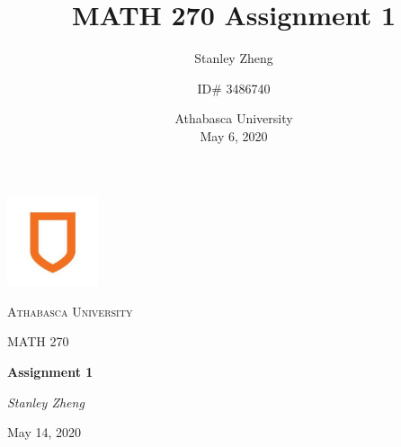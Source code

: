 \documentclass[11pt, letterpaper, twoside]{article}
\title{MATH 270 Assignment 1}
\date{Athabasca University\\May 6, 2020}
\author{Stanley Zheng\and ID\# 3486740}
\begin{document}
\begin{titlepage}
	\centering
	\vspace*{60px}
	\hspace{0pt}
	\includegraphics[width=0.2\textwidth]{logo}\par\vspace{1cm}
	{\scshape\LARGE Athabasca University \par}
	\vspace{1cm}
	{\scshape\Large MATH 270\par}
	\vspace{1.5cm}
	{\huge\bfseries Assignment 1\par}
	\vspace{2cm}
	{\Large\itshape Stanley Zheng\par}
	\vfill
	{\large May 14, 2020\par}
	\vspace*{50px}
	\hspace{0pt}
\pagebreak
\end{titlepage}
\end{document}
